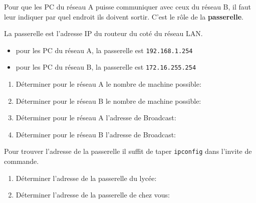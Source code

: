 \pagebreak

\begin{definition}{}
    Pour que les PC du réseau A puisse communiquer avec ceux du réseau B, il faut leur indiquer par quel endroit ils doivent  \og{}sortir\fg{}. C'est le rôle de la \textbf{passerelle}.

    La passerelle est l'adresse IP du routeur du coté du réseau LAN.

    \begin{itemize}
        \item pour les PC du réseau A, la passerelle est \verb+192.168.1.254+
        \item pour les PC du réseau B, la passerelle est \verb+172.16.255.254+
    \end{itemize}
    \end{definition}


\begin{exercice_cours}{}

\begin{enumerate}
    \item Déterminer pour le réseau A le nombre de machine possible: \dotfill
    \item Déterminer pour le réseau B le nombre de machine possible: \dotfill
    \item Déterminer pour le réseau A l'adresse de Broadcast: \dotfill
    \item Déterminer pour le réseau B l'adresse de Broadcast: \dotfill
\end{enumerate}
\end{exercice_cours}

\begin{exercice_cours}{}
    
    Pour trouver l'adresse de la passerelle il suffit de taper \verb+ipconfig+ dans l'invite de commande.

    \begin{enumerate}
        \item Déterminer l'adresse de la passerelle du lycée: \dotfill
        \item Déterminer l'adresse de la passerelle de chez vous: \dotfill
    \end{enumerate}

\end{exercice_cours}

